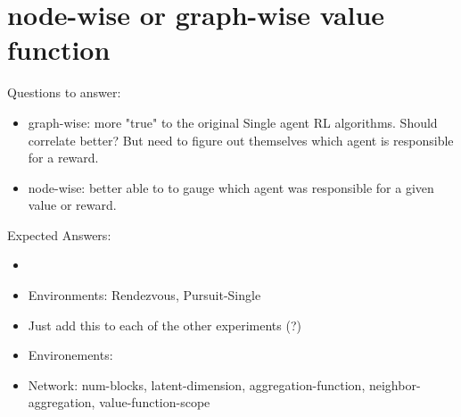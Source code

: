 \section{node-wise or graph-wise value function}
Questions to answer:
\begin{itemize}[noitemsep,nolistsep]
    \item graph-wise: more "true" to the original Single agent RL algorithms. Should correlate better? But need to figure out themselves which agent is responsible for a reward.
    \item node-wise: better able to to gauge which agent was responsible for a given value or reward. 
\end{itemize}
Expected Answers:
\begin{itemize}[noitemsep,nolistsep]
    \item 
\end{itemize}
\begin{itemize}[noitemsep,nolistsep]
    \item Environments: Rendezvous, Pursuit-Single
    \item Just add this to each of the other experiments (?)
    \item Environements: 
    \item Network: num-blocks, latent-dimension, aggregation-function, neighbor-aggregation, value-function-scope
\end{itemize}